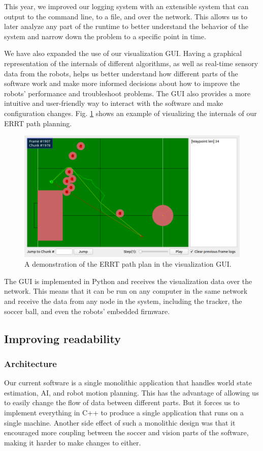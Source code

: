 \documentclass[runningheads]{llncs}
\begin{document}
This year, we improved our logging system with an extensible system that can output to the command line, to a file, and over the network. This allows us to later analyze any part of the runtime to better understand the behavior of the system and narrow down the problem to a specific point in time.

We have also expanded the use of our visualization GUI. Having a graphical representation of the internals of different algorithms, as well as real-time sensory data from the robots, helps us better understand how different parts of the software work and make more informed decisions about how to improve the robots' performance and troubleshoot problems. The GUI also provides a more intuitive and user-friendly way to interact with the software and make configuration changes. Fig. \ref{fig_visualizer} shows an example of visualizing the internals of our ERRT path planning.

\begin{figure}
    \includegraphics[width=\textwidth]{images/visual1.png}
    \caption{A demonstration of the ERRT path plan in the visualization GUI.}
    \label{fig_visualizer}
\end{figure}

The GUI is implemented in Python and receives the visualization data over the network. This means that it can be run on any computer in the same network and receive the data from any node in the system, including the tracker, the soccer ball, and even the robots' embedded firmware.


\subsection{Improving readability}

\subsubsection{Architecture}
Our current software is a single monolithic application that handles world state estimation, AI, and robot motion planning. This has the advantage of allowing us to easily change the flow of data between different parts. But it forces us to implement everything in C++ to produce a single application that runs on a single machine. Another side effect of such a monolithic design was that it encouraged more coupling between the soccer and vision parts of the software, making it harder to make changes to either.
\end{document}
